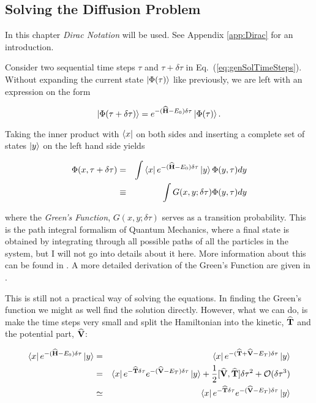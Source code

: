 \subsection{Solving the Diffusion Problem}

In this chapter \textit{Dirac Notation} will be used. See Appendix \ref{app:Dirac} for an introduction.

Consider two sequential time steps $\tau$ and $\tau + \delta\tau$ in Eq.~(\ref{eq:genSolTimeSteps}). Without expanding the current state $\left| \Phi(\tau) \right>$ like previously, we are left with an expression on the form

\begin{equation*}
 \left| \Phi(\tau + \delta\tau) \right> = e^{-({\bf\widehat{H}} - E_0)\delta\tau}\left| \Phi(\tau) \right>.
\end{equation*}

Taking the inner product with $\left< x \right|$ on both sides and inserting a complete set of states $\left| y \right>$ on the left hand side yields

\begin{eqnarray*}
 \Phi(x, \tau + \delta\tau) &=& \int \left< x \right|e^{-({\bf\widehat{H}} - E_0)\delta\tau}\left| y \right>\Phi(y, \tau)dy \\
			     &\equiv& \int G(x, y; \delta\tau)\Phi(y, \tau)dy
\end{eqnarray*}

where the \textit{Green's Function}, $G(x, y; \delta\tau)$ serves as a transition probability. This is the path integral formalism of Quantum Mechanics, where a final state is obtained by integrating through all possible paths of all the particles in the system, but I will not go into details about it here. More information about this can be found in \cite{leinaas}. A more detailed derivation of the Green's Function are given in \cite{abInitioMC}.

This is still not a practical way of solving the equations. In finding the Green's function we might as well find the solution directly. However, what we can do, is make the time steps very small and split the Hamiltonian into the kinetic, ${\bf\widehat{T}}$ and the potential part, ${\bf\widehat{V}}$:

\begin{eqnarray}
 \left< x \right|e^{-({\bf\widehat{H}} - E_0)\delta\tau}\left| y \right> &=& \left< x \right|e^{-({\bf\widehat{T}} + {\bf\widehat{V}} - E_T)\delta\tau}\left| y \right> \nonumber \\
                                             &=& \left< x \right|e^{-{\bf\widehat{T}}\delta\tau}e^{-({\bf\widehat{V}} - E_T)\delta\tau}\left| y \right> + \frac{1}{2}[{\bf\widehat{V}}, {\bf\widehat{T}}]\delta\tau^2 + \mathcal{O}(\delta\tau^3) \nonumber \\
                                             &\simeq& \left< x \right|e^{-{\bf\widehat{T}}\delta\tau}e^{-({\bf\widehat{V}} - E_T)\delta\tau}\left| y \right> 
\end{eqnarray}

